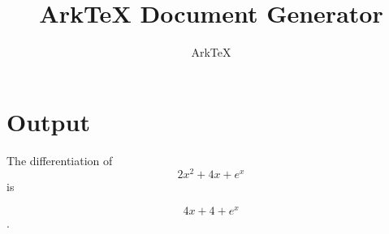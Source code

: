 \documentclass[dvips, 12pt, twoside]{article}
\begin{document}
\title{ArkTeX Document Generator}
\author{ArkTeX}
\maketitle

\medskip

\section*{Output}
\begin{LARGE}
 The differentiation of $$2x^2+4x+e^{x} $$ is 

$$ 4x + 4 + e^{x} $$ .
\end{LARGE}
\end{document}
